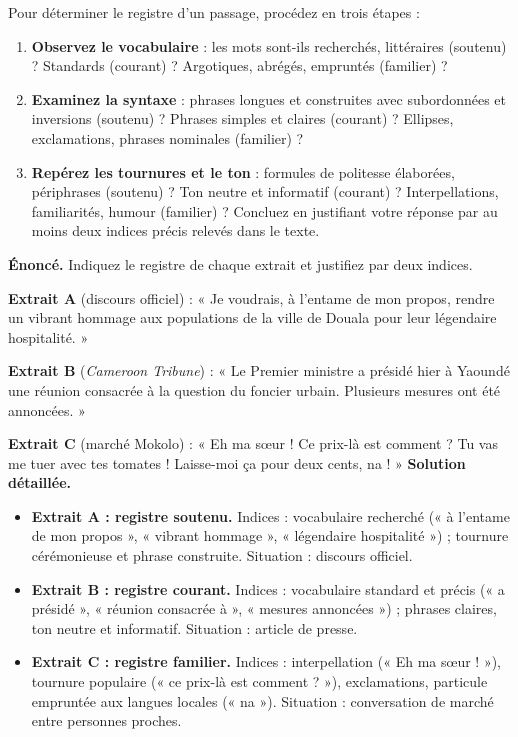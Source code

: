 \documentclass[11pt]{article}
\begin{document}
\begin{methode}
Pour déterminer le registre d'un passage, procédez en trois étapes :
\begin{enumerate}
\item \textbf{Observez le vocabulaire} : les mots sont-ils recherchés, littéraires (soutenu) ? Standards (courant) ? Argotiques, abrégés, empruntés (familier) ?
\item \textbf{Examinez la syntaxe} : phrases longues et construites avec subordonnées et inversions (soutenu) ? Phrases simples et claires (courant) ? Ellipses, exclamations, phrases nominales (familier) ?
\item \textbf{Repérez les tournures et le ton} : formules de politesse élaborées, périphrases (soutenu) ? Ton neutre et informatif (courant) ? Interpellations, familiarités, humour (familier) ?
Concluez en justifiant votre réponse par au moins deux indices précis relevés dans le texte.
\end{enumerate}
\end{methode}

\begin{exoresolu}
\textbf{Énoncé.} Indiquez le registre de chaque extrait et justifiez par deux indices.

\textbf{Extrait A} (discours officiel) : « Je voudrais, à l'entame de mon propos, rendre un vibrant hommage aux populations de la ville de Douala pour leur légendaire hospitalité. »

\textbf{Extrait B} (\emph{Cameroon Tribune}) : « Le Premier ministre a présidé hier à Yaoundé une réunion consacrée à la question du foncier urbain. Plusieurs mesures ont été annoncées. »

\textbf{Extrait C} (marché Mokolo) : « Eh ma sœur ! Ce prix-là est comment ? Tu vas me tuer avec tes tomates ! Laisse-moi ça pour deux cents, na ! »
\tcblower
\textbf{Solution détaillée.}
\begin{itemize}
\item \textbf{Extrait A : registre soutenu.} Indices : vocabulaire recherché (« à l'entame de mon propos », « vibrant hommage », « légendaire hospitalité ») ; tournure cérémonieuse et phrase construite. Situation : discours officiel.
\item \textbf{Extrait B : registre courant.} Indices : vocabulaire standard et précis (« a présidé », « réunion consacrée à », « mesures annoncées ») ; phrases claires, ton neutre et informatif. Situation : article de presse.
\item \textbf{Extrait C : registre familier.} Indices : interpellation (« Eh ma sœur ! »), tournure populaire (« ce prix-là est comment ? »), exclamations, particule empruntée aux langues locales (« na »). Situation : conversation de marché entre personnes proches.
\end{itemize}
\end{exoresolu}
\end{document}
